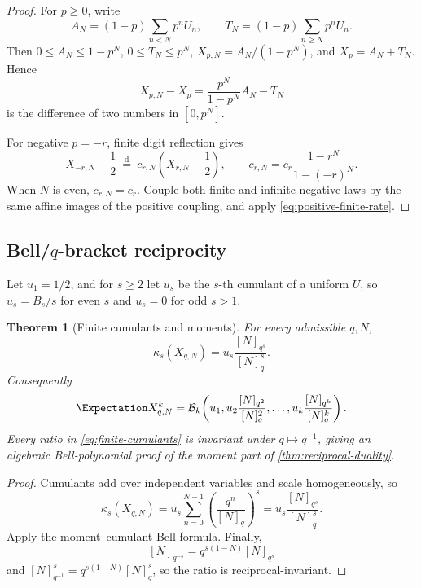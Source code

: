 \documentclass[11pt]{article}
\newtheorem{theorem}{Theorem}[section]
\theoremstyle{definition}
\newcommand{\cump}{\kappa}
\newcommand{\doteqL}{\mathrel{\stackrel{\mathrm d}=}}
\begin{document}
\begin{proof}
For \(p\ge0\), write
\[
 A_N=(1-p)\sum_{n<N}p^nU_n,\qquad
 T_N=(1-p)\sum_{n\ge N}p^nU_n.
\]
Then \(0\le A_N\le1-p^N\), \(0\le T_N\le p^N\),
\(X_{p,N}=A_N/(1-p^N)\), and \(X_p=A_N+T_N\).  Hence
\[
 X_{p,N}-X_p=\frac{p^N}{1-p^N}A_N-T_N
\]
is the difference of two numbers in \([0,p^N]\).

For negative \(p=-r\), finite digit reflection gives
\[
 X_{-r,N}-\frac12\ \doteqL\
 c_{r,N}\left(X_{r,N}-\frac12\right),
 \qquad
 c_{r,N}=c_r\frac{1-r^N}{1-(-r)^N}.
\]
When \(N\) is even, \(c_{r,N}=c_r\).  Couple both finite and infinite negative laws by
the same affine images of the positive coupling, and apply
\cref{eq:positive-finite-rate}.
\end{proof}

\subsection{Bell/$q$-bracket reciprocity}

Let \(u_1=1/2\), and for \(s\ge2\) let \(u_s\) be the $s$-th cumulant of a uniform
\(U\), so \(u_s=B_s/s\) for even \(s\) and \(u_s=0\) for odd \(s>1\).

\begin{theorem}[Finite cumulants and moments]\label{thm:finite-cumulants}
For every admissible \(q,N\),
\begin{equation}
 \boxed{
 \cump_s(X_{q,N})=u_s\frac{[N]_{q^s}}{[N]_q^s}.}          \label{eq:finite-cumulants}
\end{equation}
Consequently
\begin{equation}
 \Expectation X_{q,N}^k=
 \mathcal B_k\!\left(
 u_1,
 u_2\frac{[N]_{q^2}}{[N]_q^2},\ldots,
 u_k\frac{[N]_{q^k}}{[N]_q^k}
 \right).                                                  \label{eq:finite-bell-moment}
\end{equation}
Every ratio in \cref{eq:finite-cumulants} is invariant under
\(q\mapsto q^{-1}\), giving an algebraic Bell-polynomial proof of the moment part of
\cref{thm:reciprocal-duality}.
\end{theorem}

\begin{proof}
Cumulants add over independent variables and scale homogeneously, so
\[
 \cump_s(X_{q,N})=u_s\sum_{n=0}^{N-1}
 \left(\frac{q^n}{[N]_q}\right)^s
 =u_s\frac{[N]_{q^s}}{[N]_q^s}.
\]
Apply the moment--cumulant Bell formula.  Finally,
\[
 [N]_{q^{-s}}=q^{s(1-N)}[N]_{q^s}
\]
and \([N]_{q^{-1}}^s=q^{s(1-N)}[N]_q^s\), so the ratio is reciprocal-invariant.
\end{proof}
\end{document}
